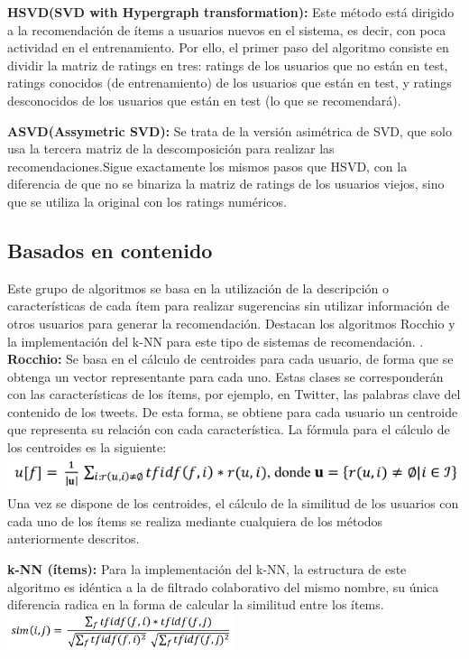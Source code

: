 		\textbf{HSVD(SVD with Hypergraph transformation):} Este método está dirigido a la recomendación de ítems a usuarios nuevos en el sistema, es decir, con poca actividad en el entrenamiento. Por ello, el primer paso del algoritmo consiste en dividir la matriz de ratings en tres: ratings de los usuarios que no están en test, ratings conocidos (de entrenamiento) de los usuarios que están en test, y ratings desconocidos de los usuarios que están en test (lo que se recomendará).

		\textbf{ASVD(Assymetric SVD):} Se trata de la versión asimétrica de SVD, que solo usa la tercera matriz de la descomposición para realizar las recomendaciones.Sigue exactamente los mismos pasos que HSVD, con la diferencia de que no se binariza la matriz de ratings de los usuarios viejos, sino que se utiliza la original con los ratings numéricos.

		\subsection{Basados en contenido}
		Este grupo de algoritmos se basa en la utilización de la descripción o características de cada ítem para realizar sugerencias sin utilizar información de otros usuarios para generar la recomendación. Destacan los algoritmos Rocchio y la implementación del k-NN para este tipo de sistemas de recomendación.
.
		\textbf{Rocchio:} Se basa en el cálculo de centroides para cada usuario, de forma que se obtenga un vector representante para cada uno. Estas clases se corresponderán con las características de los ítems, por ejemplo, en Twitter, las palabras clave del contenido de los tweets. De esta forma, se obtiene para cada usuario un centroide que representa su relación con cada característica. La fórmula para el cálculo de los centroides es la siguiente:\\
		\includegraphics[width=\textwidth]{images/rocchio}
		Una vez se dispone de los centroides, el cálculo de la similitud de los usuarios con cada uno de los ítems se realiza mediante cualquiera de los métodos anteriormente descritos. 

		\textbf{k-NN (ítems):} Para la implementación del k-NN, la estructura de este algoritmo es idéntica a la de filtrado colaborativo del mismo nombre, su única diferencia radica en la forma de calcular la similitud entre los ítems.\\
		\includegraphics[width=0.5\textwidth]{images/knn_items}

